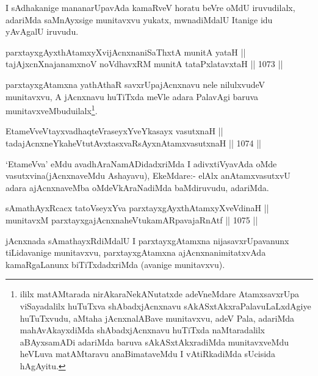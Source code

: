 \begin{artha}
I sAdhakanige mananarUpavAda kamaRveV horatu beVre oMdU iruvudilalx, adariMda saMnAyxsige munitavxvu yukatx, mwnadiMdalU Itanige idu yAvAgalU iruvudu.
\end{artha}


\begin{shl}
parxtayxgAyxthAtamxyXvijAcnxnaniSaThxtA munitA yataH || \\
tajAjxcnXnajanamxnoV noVdhavxRM munitA tataPxlatavxtaH \hfill || 1073 ||  
\end{shl}

\begin{artha}
parxtayxgAtamxna yathAthaR savxrUpajAcnxnavu nele nilulxvudeV munitavxvu, A jAcnxnavu huTiTxda meVle adara PalavAgi baruva munitavxveMbuduilalx\footnote{ililx matAMtarada nirAkaraNekANutatxde adeVneMdare AtamxsavxrUpa viSayadalilx huTuTxva shAbadxjAcnxnavu sAkASxtAkxraPalavuLaLxdAgiye huTuTxvudu, aMtaha jAcnxnalABave munitavxvu, adeV Pala, adariMda mahAvAkayxdiMda shAbadxjAcnxnavu huTiTxda naMtaradalilx aBAyxsamADi adariMda baruva sAkASxtAkxradiMda munitavxveMdu heVLuva matAMtaravu anaBimataveMdu I vAtiRkadiMda sUcisida hAgAyitu.}.
\end{artha}

\begin{shl}
EtameVveVtayxvadhaqteVraseyxYveYkasayx vasutxnaH || \\
tadajAcnxneYkaheVtutAvxtasxvaRsAyxnAtamxvasutxnaH \hfill || 1074 ||  
\end{shl}

\begin{artha}
`EtameVva' eMdu avadhAraNamADidadxriMda I adivxtiVyavAda oMde vasutxvina(jAcnxnaveMdu Ashayavu), EkeMdare:- elAlx anAtamxvasutxvU adara ajAcnxnaveMba oMdeVkAraNadiMda baMdiruvudu, adariMda.
\end{artha}

\begin{shl}
sAmathAyxRcacx tatoV\s seyxYva parxtayxgAyxthAtamxyXveVdinaH ||  \\
munitavxM parxtayxgajAcnxnaheVtukamARpavajaRnAtf \hfill || 1075 ||  
\end{shl}

\begin{artha}
jAcnxnada sAmathayxRdiMdalU I parxtayxgAtamxna nijasavxrUpavanunx tiLidavanige munitavxvu, parxtayxgAtamxna ajAcnxnanimitatxvAda kamaRgaLanunx biTiTxdadxriMda (avanige munitavxvu).
\end{artha}

